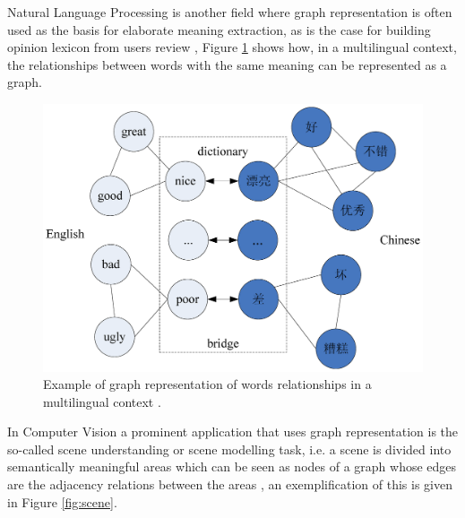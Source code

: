 Natural Language Processing is another field where graph representation is often used
as the basis for elaborate meaning extraction, as is the case for building opinion
lexicon from users review \cite{10.1371/journal.pone.0079294}, Figure \ref{fig:wordrel}
shows how, in a multilingual context, the relationships between words with the same meaning
can be represented as a graph.

\begin{figure}[ht]
    \centering
    \includegraphics[width=.6\linewidth]{Figures/wordrel}
    \caption{Example of graph representation of words relationships in a multilingual
    context \cite{10.1371/journal.pone.0079294}.}
    \label{fig:wordrel}
\end{figure}

In Computer Vision a prominent application that uses graph representation is
the so-called scene understanding or scene modelling task, i.e. a scene is divided
into semantically meaningful areas which can be seen as nodes of a graph whose
edges are the adjacency relations between the areas \cite{journals/corr/abs-1108-4079},
an exemplification of this is given in Figure \ref{fig:scene}.

